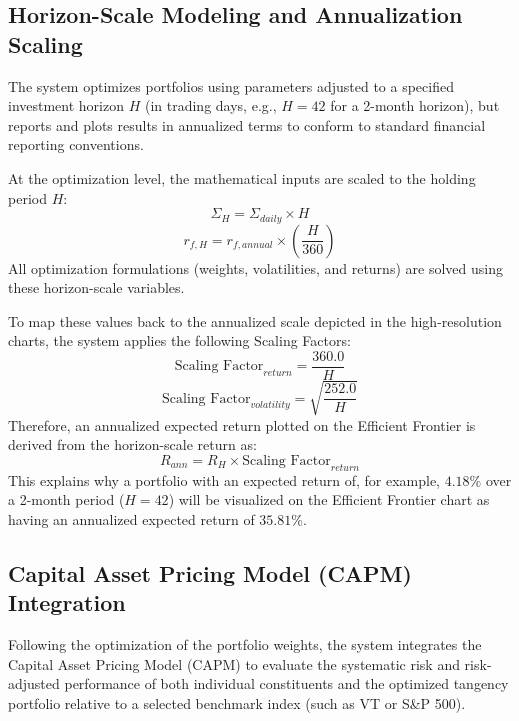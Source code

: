 \documentclass[11pt,a4paper]{article}
\begin{document}
\subsection{Horizon-Scale Modeling and Annualization Scaling}
The system optimizes portfolios using parameters adjusted to a specified investment horizon $H$ (in trading days, e.g., $H = 42$ for a 2-month horizon), but reports and plots results in annualized terms to conform to standard financial reporting conventions. 

At the optimization level, the mathematical inputs are scaled to the holding period $H$:
\begin{equation}
\Sigma_H = \Sigma_{daily} \times H
\end{equation}
\begin{equation}
r_{f, H} = r_{f, annual} \times \left( \frac{H}{360} \right)
\end{equation}
All optimization formulations (weights, volatilities, and returns) are solved using these horizon-scale variables. 

To map these values back to the annualized scale depicted in the high-resolution charts, the system applies the following Scaling Factors:
\begin{equation}
\text{Scaling Factor}_{return} = \frac{360.0}{H}
\end{equation}
\begin{equation}
\text{Scaling Factor}_{volatility} = \sqrt{\frac{252.0}{H}}
\end{equation}
Therefore, an annualized expected return plotted on the Efficient Frontier is derived from the horizon-scale return as:
\begin{equation}
R_{ann} = R_{H} \times \text{Scaling Factor}_{return}
\end{equation}
This explains why a portfolio with an expected return of, for example, $4.18\%$ over a 2-month period ($H = 42$) will be visualized on the Efficient Frontier chart as having an annualized expected return of $35.81\%$.

\subsection{Capital Asset Pricing Model (CAPM) Integration}
Following the optimization of the portfolio weights, the system integrates the Capital Asset Pricing Model (CAPM) to evaluate the systematic risk and risk-adjusted performance of both individual constituents and the optimized tangency portfolio relative to a selected benchmark index (such as VT or S\&P 500).
\end{document}
